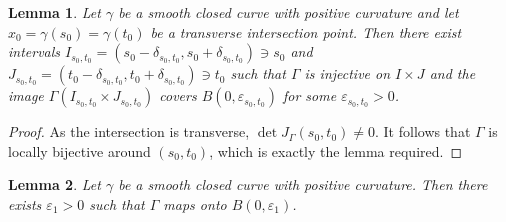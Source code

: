 \documentclass[12pt,a4paper,oneside]{amsart}
\newtheorem{lemma}{Lemma}
\theoremstyle{definition}
\newcounter{rem}
\begin{document}
\begin{lemma}\label{lemma-tranverse}
    Let $\gamma$ be a smooth closed curve with positive curvature and let $x_0 = \gamma(s_0) = \gamma(t_0)$ be a transverse intersection point. Then there exist intervals $I_{s_0,t_0} = (s_0-\delta_{s_0,t_0},s_0+\delta_{s_0,t_0})\ni s_0$ and $J_{s_0,t_0}=(t_0-\delta_{s_0,t_0},t_0+\delta_{s_0,t_0})\ni t_0$ such that $\Gamma$ is injective on $I\times J$ and the image $\Gamma(I_{s_0,t_0}\times J_{s_0,t_0})$ covers $B(0, \varepsilon_{s_0,t_0})$ for some $\varepsilon_{s_0,t_0}>0$. 
\end{lemma}

\begin{proof}
    As the intersection is transverse, $\det J_{\Gamma}(s_0,t_0)\ne 0$. It follows that $\Gamma$ is locally bijective around $(s_0,t_0)$, which is exactly the lemma required.
\end{proof}

\begin{lemma}\label{lemma-ball cover}
    Let $\gamma$ be a smooth closed curve with positive curvature. Then there exists $\varepsilon_1>0$ such that $\Gamma$ maps  onto $B(0,\varepsilon_1)$. 
\end{lemma}
\end{document}
